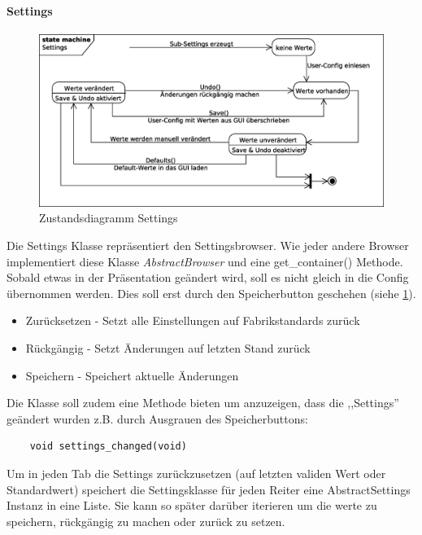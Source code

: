 \paragraph{Settings}
\begin{figure}[htb!]
	\centering
        \includegraphics[width=\textwidth]{st_Settings.eps}
	\caption{Zustandsdiagramm Settings}
	\label{st_settings}
\end{figure}
Die Settings Klasse repräsentiert den Settingsbrowser. Wie jeder andere Browser implementiert diese Klasse \emph{AbstractBrowser} und eine get\_container() Methode.
Sobald etwas in der Präsentation geändert wird, soll es nicht gleich in die Config übernommen werden.
Dies soll erst durch den Speicherbutton geschehen (siehe \ref{st_settings}).
\begin{itemize}
\item Zurücksetzen - Setzt alle Einstellungen auf Fabrikstandards zurück
\item Rückgängig - Setzt Änderungen auf letzten Stand zurück
\item Speichern - Speichert aktuelle Änderungen
\end{itemize}

Die Klasse soll zudem eine Methode bieten um anzuzeigen, dass die ,,Settings'' geändert wurden z.B. durch Ausgrauen des Speicherbuttons:
\begin{verbatim}
    void settings_changed(void)
\end{verbatim}
Um in jeden Tab die Settings zurückzusetzen (auf letzten validen Wert oder Standardwert) speichert die Settingsklasse für jeden Reiter eine AbstractSettings Instanz in eine Liste. Sie kann so später darüber iterieren um die werte zu speichern, rückgängig zu machen oder zurück zu setzen. 


